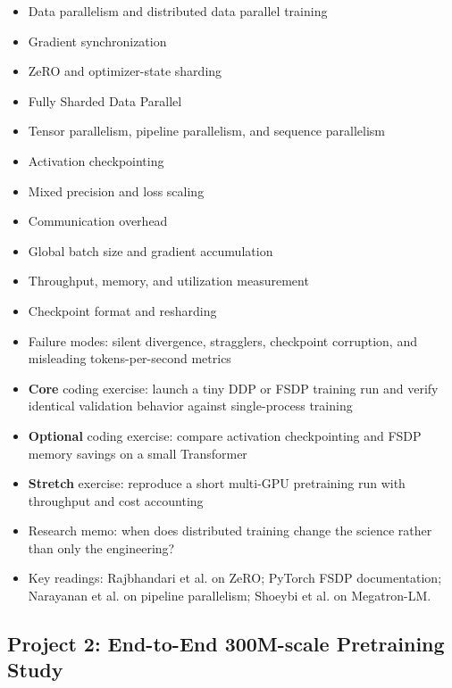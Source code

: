 \documentclass[11pt]{article}
\begin{document}
\begin{itemize}
    \item Data parallelism and distributed data parallel training
    \item Gradient synchronization
    \item ZeRO and optimizer-state sharding
    \item Fully Sharded Data Parallel
    \item Tensor parallelism, pipeline parallelism, and sequence parallelism
    \item Activation checkpointing
    \item Mixed precision and loss scaling
    \item Communication overhead
    \item Global batch size and gradient accumulation
    \item Throughput, memory, and utilization measurement
    \item Checkpoint format and resharding
    \item Failure modes: silent divergence, stragglers, checkpoint corruption, and misleading tokens-per-second metrics
    \item \textbf{Core} coding exercise: launch a tiny DDP or FSDP training run and verify identical validation behavior against single-process training
    \item \textbf{Optional} coding exercise: compare activation checkpointing and FSDP memory savings on a small Transformer
    \item \textbf{Stretch} exercise: reproduce a short multi-GPU pretraining run with throughput and cost accounting
    \item Research memo: when does distributed training change the science rather than only the engineering?
    \item Key readings: Rajbhandari et al. on ZeRO; PyTorch FSDP documentation; Narayanan et al. on pipeline parallelism; Shoeybi et al. on Megatron-LM.
\end{itemize}

\subsection{Project 2: End-to-End 300M-scale Pretraining Study}
\end{document}
